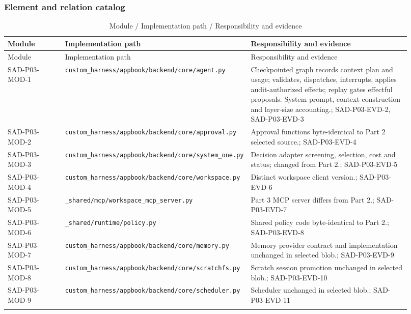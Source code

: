 \documentclass[10pt,letterpaper]{article}
\begin{document}
\subsubsection{Element and relation catalog}
\begin{longtable}{@{}>{\raggedright\arraybackslash}p{0.15\linewidth}>{\raggedright\arraybackslash}p{0.34\linewidth}>{\raggedright\arraybackslash}p{0.43\linewidth}@{}}
\caption{Module / Implementation path / Responsibility and evidence}\\
\toprule Module & Implementation path & Responsibility and evidence\\\midrule\endfirsthead
\toprule Module & Implementation path & Responsibility and evidence\\\midrule\endhead
SAD-P03-MOD-1 & \nolinkurl{custom_harness/appbook/backend/core/agent.py} & Checkpointed graph records context plan and usage; validates, dispatches, interrupts, applies audit-authorized effects; replay gates effectful proposals. System prompt, context construction and layer-size accounting.; SAD-P03-EVD-2, SAD-P03-EVD-3\\\addlinespace
SAD-P03-MOD-2 & \nolinkurl{custom_harness/appbook/backend/core/approval.py} & Approval functions byte-identical to Part 2 selected source.; SAD-P03-EVD-4\\\addlinespace
SAD-P03-MOD-3 & \nolinkurl{custom_harness/appbook/backend/core/system_one.py} & Decision adapter screening, selection, cost and status; changed from Part 2.; SAD-P03-EVD-5\\\addlinespace
SAD-P03-MOD-4 & \nolinkurl{custom_harness/appbook/backend/core/workspace.py} & Distinct workspace client version.; SAD-P03-EVD-6\\\addlinespace
SAD-P03-MOD-5 & \nolinkurl{_shared/mcp/workspace_mcp_server.py} & Part 3 MCP server differs from Part 2.; SAD-P03-EVD-7\\\addlinespace
SAD-P03-MOD-6 & \nolinkurl{_shared/runtime/policy.py} & Shared policy code byte-identical to Part 2.; SAD-P03-EVD-8\\\addlinespace
SAD-P03-MOD-7 & \nolinkurl{custom_harness/appbook/backend/core/memory.py} & Memory provider contract and implementation unchanged in selected blob.; SAD-P03-EVD-9\\\addlinespace
SAD-P03-MOD-8 & \nolinkurl{custom_harness/appbook/backend/core/scratchfs.py} & Scratch session promotion unchanged in selected blob.; SAD-P03-EVD-10\\\addlinespace
SAD-P03-MOD-9 & \nolinkurl{custom_harness/appbook/backend/core/scheduler.py} & Scheduler unchanged in selected blob.; SAD-P03-EVD-11\\\addlinespace

\end{longtable}
\end{document}
